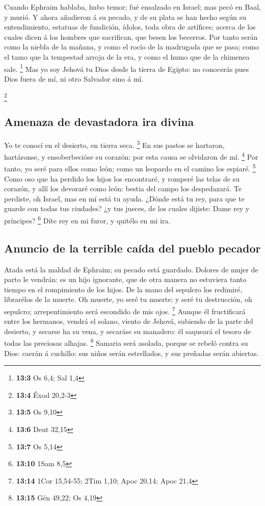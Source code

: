  Cuando Ephraim hablaba, hubo temor; fué ensalzado en
Israel; mas pecó en Baal, y murió.  Y ahora añadieron á su
pecado, y de su plata se han hecho según su entendimiento, estatuas de
fundición, ídolos, toda obra de artífices; acerca de los cuales dicen á
los hombres que sacrifican, que besen los becerros.  Por
tanto serán como la niebla de la mañana, y como el rocío de la madrugada
que se pasa; como el tamo que la tempestad arroja de la era, y como el
humo que de la chimenea sale. \footnote{\textbf{13:3} Os 6,4; Sal 1,4}
 Mas yo soy Jehová tu Dios desde la tierra de Egipto: no
conocerás pues Dios fuera de mí, ni otro Salvador sino á mí.

\footnote{\textbf{13:4} Éxod 20,2-3}

\hypertarget{amenaza-de-devastadora-ira-divina}{%
\subsection{Amenaza de devastadora ira
divina}\label{amenaza-de-devastadora-ira-divina}}

 Yo te conocí en el desierto, en tierra seca. \footnote{\textbf{13:5}
  Os 9,10}  En sus pastos se hartaron, hartáronse, y
ensoberbecióse su corazón: por esta causa se olvidaron de mí.
\footnote{\textbf{13:6} Deut 32,15}  Por tanto, yo seré
para ellos como león; como un leopardo en el camino los espiaré.
\footnote{\textbf{13:7} Os 5,14}  Como oso que ha perdido
los hijos los encontraré, y romperé las telas de su corazón, y allí los
devoraré como león: bestia del campo los despedazará.  Te
perdiste, oh Israel, mas en mí está tu ayuda.  ¿Dónde
está tu rey, para que te guarde con todas tus ciudades? ¿y tus jueces,
de los cuales dijiste: Dame rey y príncipes? \footnote{\textbf{13:10}
  1Sam 8,5}  Díte rey en mi furor, y quitélo en mi ira.

\hypertarget{anuncio-de-la-terrible-cauxedda-del-pueblo-pecador}{%
\subsection{Anuncio de la terrible caída del pueblo
pecador}\label{anuncio-de-la-terrible-cauxedda-del-pueblo-pecador}}

 Atada está la maldad de Ephraim; su pecado está
guardado.  Dolores de mujer de parto le vendrán: es un
hijo ignorante, que de otra manera no estuviera tanto tiempo en el
rompimiento de los hijos.  De la mano del sepulcro los
redimiré, librarélos de la muerte. Oh muerte, yo seré tu muerte; y seré
tu destrucción, oh sepulcro; arrepentimiento será escondido de mis ojos.
\footnote{\textbf{13:14} 1Cor 15,54-55; 2Tim 1,10; Apoc 20,14; Apoc 21,4}
 Aunque él fructificará entre los hermanos, vendrá el
solano, viento de Jehová, subiendo de la parte del desierto, y secarse
ha su vena, y secaráse su manadero: él saqueará el tesoro de todas las
preciosas alhajas. \footnote{\textbf{13:15} Gén 49,22; Os 4,19}
 Samaria será asolada, porque se rebeló contra su Dios:
caerán á cuchillo: sus niños serán estrellados, y sus preñadas serán
abiertas.

